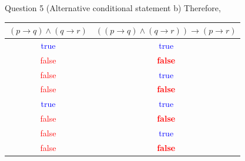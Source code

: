 \documentclass[10pt]{beamer}
\begin{document}
\begin{frame}[fragile]{Question 5 (Alternative conditional statement b)}
Therefore,
\begin{table}
\centering
\begin{tabular}{|c|c|} 
\hline
$(p \rightarrow q) \land (q \rightarrow r)$  & $((p \rightarrow q) \land (q \rightarrow r)) \rightarrow (p \rightarrow r) $   \\ 
\hline
\textcolor{blue}{true}                       & \textcolor{blue}{true}                                                         \\ 
\hline
\textcolor{red}{false}                       & \textcolor{red}{\textbf{false}}                                                         \\ 
\hline
\textcolor{red}{false}                       & \textcolor{blue}{true}                                                         \\ 
\hline
\textcolor{red}{false}                       & \textcolor{red}{\textbf{false}}                                                         \\ 
\hline
\textcolor{blue}{true}                       & \textcolor{blue}{true}                                                         \\ 
\hline
\textcolor{red}{false}                       & \textcolor{red}{\textbf{false}}                                                         \\ 
\hline
\textcolor{red}{false}                       & \textcolor{blue}{true}                                                         \\ 
\hline
\textcolor{red}{false}                       & \textcolor{red}{\textbf{false}}                                                         \\
\hline
\end{tabular}
\end{table}
\end{frame}
\end{document}
